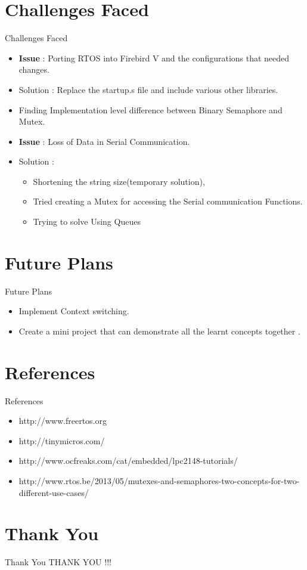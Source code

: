 \documentclass[10pt, a4paper]{beamer}
\begin{document}
\section{Challenges Faced}
\begin{frame}{Challenges Faced}
    \begin{itemize}
        \item \textbf{Issue} : Porting RTOS into Firebird V and the configurations that needed changes.
        \item Solution : Replace the startup.s file and include various other libraries.
        
        \item Finding Implementation level difference between Binary Semaphore and Mutex.
        
        \item \textbf{Issue} : Loss of Data in Serial Communication.
        \item Solution :
        
        \begin{itemize}
        \item Shortening the string size(temporary solution),
        \item Tried creating a Mutex for accessing the Serial communication Functions.
        \item Trying to solve Using Queues
        \end{itemize}
        
    \end{itemize}
\end{frame}
\section{Future Plans}
\begin{frame}{Future Plans}
    \begin{itemize}
        \item Implement Context switching.
        \item Create a mini project that can demonstrate all the learnt concepts together . 
        
    \end{itemize}
\end{frame}

\section{References}
\begin{frame}{References}
    \begin{itemize}
        \item http://www.freertos.org
        \item http://tinymicros.com/
        \item http://www.ocfreaks.com/cat/embedded/lpc2148-tutorials/
        \item http://www.rtos.be/2013/05/mutexes-and-semaphores-two-concepts-for-two-different-use-cases/
    \end{itemize}
\end{frame}

\section{Thank You}
\begin{frame}{Thank You}
    \centering THANK YOU !!!
\end{frame}
\end{document}

